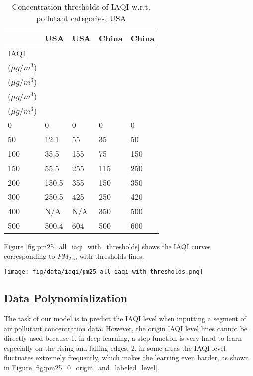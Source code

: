 \documentclass[
twocolumn,
]{ceurart}
\begin{document}
\begin{table}[!htbp]
    \centering
    \caption{Concentration thresholds of IAQI w.r.t. pollutant categories, USA}
    \label{table:IAQI_thresholds}
    \begin{tabular}{l|l|l|l|l}
        \hline
        \hline
        \  & USA & USA & China & China \\ \hline
        IAQI & \makecell[c]{$PM_{2.5}$ \\ ($\mu g/m^3$)} & \makecell[c]{$PM_{10}$ \\ ($\mu g/m^3$)} & \makecell[c]{$PM_{2.5}$ \\ ($\mu g/m^3$)} & \makecell[c]{$PM_{10}$ \\ ($\mu g/m^3$)} \\ \hline
        0    & 0     & 0   & 0   & 0   \\ \hline
        50   & 12.1  & 55  & 35  & 50  \\ \hline
        100  & 35.5  & 155 & 75  & 150 \\ \hline
        150  & 55.5  & 255 & 115 & 250 \\ \hline
        200  & 150.5 & 355 & 150 & 350 \\ \hline
        300  & 250.5 & 425 & 250 & 420 \\ \hline
        400  & N/A   & N/A & 350 & 500 \\ \hline
        500  & 500.4 & 604 & 500 & 600 \\ \hline
        \hline
    \end{tabular}
\end{table}

Figure \ref{fig:pm25_all_iaqi_with_thresholds} shows the IAQI curves corresponding to $PM_{2.5}$, with thresholds lines.

\begin{figure*}[!htbp]
    \begin{center}
        \texttt{[image: fig/data/iaqi/pm25\_all\_iaqi\_with\_thresholds.png]}
    \end{center}
    \caption{All $PM_{2.5}$ data with IAQI thresholds.}
    \label{fig:pm25_all_iaqi_with_thresholds}
\end{figure*}

\subsection{Data Polynomialization}

The task of our model is to predict the IAQI level when inputting a segment of air pollutant concentration data. However, the origin IAQI level lines cannot be directly used because 1. in deep learning, a step function is very hard to learn especially on the rising and falling edges; 2. in some areas the IAQI level fluctuates extremely frequently, which makes the learning even harder, as shown in Figure \ref{fig:pm25_0_origin_and_labeled_level}.
\end{document}
